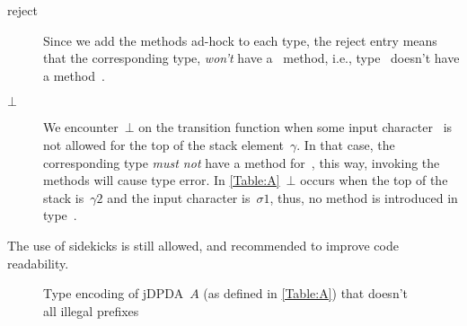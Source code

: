 \begin{description}
 \item[\textsf{reject}] Since we add the methods ad-hock to each type, the reject entry means
   that the corresponding type, \emph{won't} have a~\cc{\$()} method, i.e., type~
   doesn't have a method~\cc{\$()}.
 \item[$⊥$] We encounter~$⊥$ on the transition function when some input character~
   is not allowed for the top of the stack element~$γ$. In that case, the corresponding type 
   \emph{must not} have a method for~, this way, invoking the methods will cause type error.
   In \cref{Table:A}~$⊥$ occurs when the top of the stack is~$γ{}2$ and the input character is~$σ{}1$,
   thus, no method  is introduced in type~.
\end{description}

The use of sidekicks is still allowed, and recommended to improve code readability.

\begin{figure}[htbp]
  \caption{\label{Figure:prefix-A}Type encoding of jDPDA~$A$ (as defined in \cref{Table:A})
    that doesn't all illegal prefixes}
\end{figure}